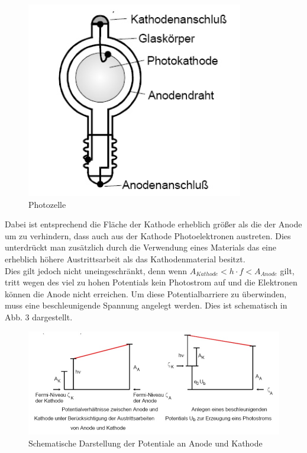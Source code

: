 \begin{figure}[h]
	\centering
	\includegraphics[scale = 0.6, ]{Grafiken/V500_Abb2.jpg}
	\caption{Photozelle\cite{V500}}
\end{figure}
Dabei ist entsprechend die Fläche der Kathode erheblich größer als die der Anode um zu verhindern, dass auch aus der Kathode Photoelektronen austreten. Dies unterdrückt man zusätzlich durch die Verwendung eines Materials das eine erheblich höhere Austrittsarbeit als das Kathodenmaterial besitzt.\\

Dies gilt jedoch nicht uneingeschränkt, denn wenn $A_{Kathode} < h \cdot f <  A_{Anode}$ gilt, tritt wegen des viel zu hohen Potentials kein Photostrom auf und die Elektronen können die Anode nicht erreichen. Um diese Potentialbarriere zu überwinden, muss eine beschleunigende Spannung angelegt werden. Dies ist schematisch in Abb. 3 dargestellt.\\

\begin{figure}[h]
	\centering
	\includegraphics[scale = 0.6,]{Grafiken/V500_Abb3.jpg}
	\caption{Schematische Darstellung der Potentiale an Anode und Kathode\cite{V500}}
\end{figure}


